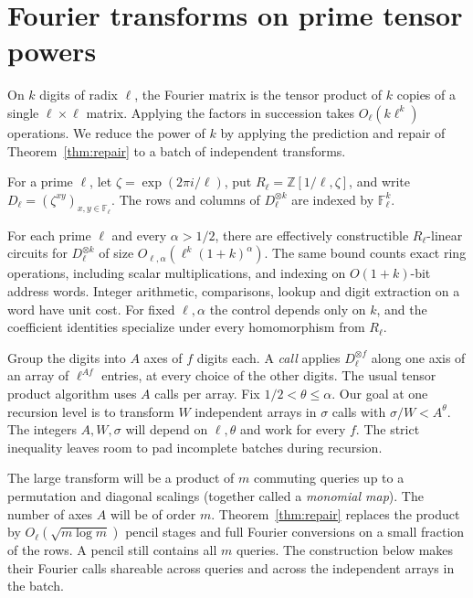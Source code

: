 \section{Fourier transforms on prime tensor powers}
\label{sec:prime-kernel}

On \(k\) digits of radix \(\ell\), the Fourier matrix is the tensor
product of \(k\) copies of a single \(\ell\times\ell\) matrix. Applying
the factors in succession takes \(O_\ell(k\ell^k)\) operations. We
reduce the power of \(k\) by applying the prediction and repair of
Theorem~\ref{thm:repair} to a batch of independent transforms.

For a prime \(\ell\), let \(\zeta=\exp(2\pi i/\ell)\), put
\(R_\ell=\mathbb Z[1/\ell,\zeta]\), and write
\(D_\ell=(\zeta^{xy})_{x,y\in\mathbb F_\ell}\). The rows and columns
of \(D_\ell^{\otimes k}\) are indexed by \(\mathbb F_\ell^k\).

\begin{theorem}\label{thm:kernel}
For each prime \(\ell\) and every \(\alpha>1/2\), there are effectively
constructible \(R_\ell\)-linear circuits for \(D_\ell^{\otimes k}\)
of size \(O_{\ell,\alpha}(\ell^k(1+k)^\alpha)\).
The same bound counts exact ring operations, including scalar
multiplications, and indexing on \(O(1+k)\)-bit address words.
Integer arithmetic, comparisons, lookup and digit extraction on a
word have unit cost. For fixed \(\ell,\alpha\) the control depends only
on \(k\), and the coefficient identities specialize under every
homomorphism from \(R_\ell\).
\end{theorem}

Group the digits into \(A\) axes of \(f\) digits each. A \emph{call}
applies \(D_\ell^{\otimes f}\) along one axis of an array of
\(\ell^{Af}\) entries, at every choice of the other digits. The
usual tensor product algorithm uses \(A\) calls per array. Fix
\(1/2<\theta\le\alpha\). Our goal at one recursion level is to
transform \(W\) independent arrays in \(\sigma\) calls with
\(\sigma/W<A^\theta\). The integers \(A,W,\sigma\) will depend on
\(\ell,\theta\) and work for every \(f\). The strict inequality leaves
room to pad incomplete batches during recursion.

The large transform will be a product of \(m\) commuting queries
up to a permutation and diagonal scalings (together called a
\emph{monomial map}). The number of axes \(A\) will be of order \(m\).
Theorem~\ref{thm:repair} replaces the product by
\(O_\ell(\sqrt{m\log m})\) pencil stages and full Fourier
conversions on a small fraction of the rows. A pencil still contains all \(m\) queries. The construction
below makes their Fourier calls shareable across queries and across the
independent arrays in the batch.

